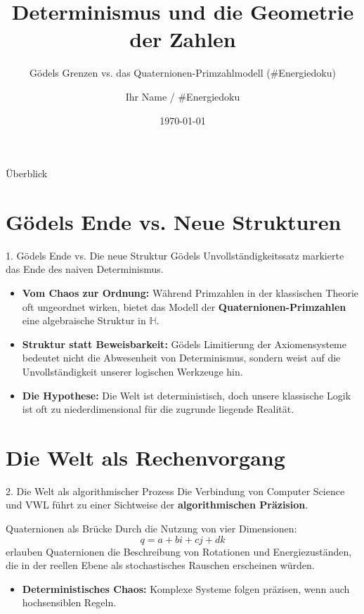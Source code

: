 \documentclass{beamer}
\title{Determinismus und die Geometrie der Zahlen}
\subtitle{Gödels Grenzen vs. das Quaternionen-Primzahlmodell (\#Energiedoku)}
\author{Ihr Name / \#Energiedoku}
\date{\today}
\begin{document}
	
	\begin{frame}
		\titlepage
	\end{frame}
	
	\begin{frame}{Überblick}
		\tableofcontents
	\end{frame}
	
	\section{Gödels Ende vs. Neue Strukturen}
	\begin{frame}{1. Gödels Ende vs. Die neue Struktur}
		Gödels Unvollständigkeitssatz markierte das Ende des naiven Determinismus.
		\begin{itemize}
			\item \textbf{Vom Chaos zur Ordnung:} Während Primzahlen in der klassischen Theorie oft ungeordnet wirken, bietet das Modell der \textbf{Quaternionen-Primzahlen} eine algebraische Struktur in $\mathbb{H}$.
			\item \textbf{Struktur statt Beweisbarkeit:} Gödels Limitierung der Axiomensysteme bedeutet nicht die Abwesenheit von Determinismus, sondern weist auf die Unvollständigkeit unserer logischen Werkzeuge hin.
			\item \textbf{Die Hypothese:} Die Welt ist deterministisch, doch unsere klassische Logik ist oft zu niederdimensional für die zugrunde liegende Realität.
		\end{itemize}
	\end{frame}
	
	\section{Die Welt als Rechenvorgang}
	\begin{frame}{2. Die Welt als algorithmischer Prozess}
		Die Verbindung von Computer Science und VWL führt zu einer Sichtweise der \textbf{algorithmischen Präzision}.
		\begin{block}{Quaternionen als Brücke}
			Durch die Nutzung von vier Dimensionen:
			\[ q = a + bi + cj + dk \]
			erlauben Quaternionen die Beschreibung von Rotationen und Energiezuständen, die in der reellen Ebene als stochastisches Rauschen erscheinen würden.
		\end{block}
		\begin{itemize}
			\item \textbf{Deterministisches Chaos:} Komplexe Systeme folgen präzisen, wenn auch hochsensiblen Regeln.
		\end{itemize}
	\end{frame}
	
\end{document}
